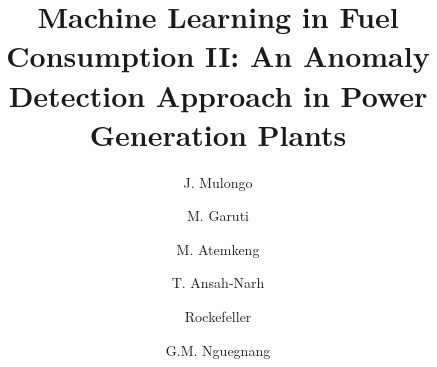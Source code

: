 \documentclass[final,5p,times,twocolumn,authoryear]{elsarticle}
\begin{document}
\begin{frontmatter}


 
\title{Machine Learning in Fuel Consumption II: An Anomaly Detection Approach in Power Generation Plants}

\author[p1,p1a]{J. Mulongo }  %
\author[p1,p2]{M. Garuti} %
\author[p3]{M. Atemkeng}  %
\author[p4,p5]{T. Ansah-Narh}  %

\author[p6]{Rockefeller}  %



\author[p1,p7]{G.M. Nguegnang } %




\address[p1]{Mathematical Sciences (AIMS-Cameroon)}
\address[p1a]{Maseno University }

\address[p4]{Centre for Radio Astronomy \& Astrophysics, Ghana Space Science and Technology Institute, Ghana Atomic Energy Commission, P. O. Box LG 80, Legon - Accra, Ghana}


\end{frontmatter}
\end{document}
